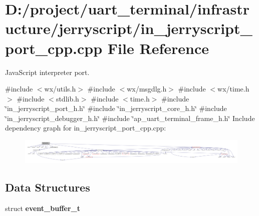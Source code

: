 \section{D\+:/project/uart\+\_\+terminal/infrastructure/jerryscript/in\+\_\+jerryscript\+\_\+port\+\_\+cpp.cpp File Reference}
\label{in__jerryscript__port__cpp_8cpp}


Java\+Script interpreter port.  


{\ttfamily \#include $<$wx/utils.\+h$>$}\newline
{\ttfamily \#include $<$wx/msgdlg.\+h$>$}\newline
{\ttfamily \#include $<$wx/time.\+h$>$}\newline
{\ttfamily \#include $<$stdlib.\+h$>$}\newline
{\ttfamily \#include $<$time.\+h$>$}\newline
{\ttfamily \#include \char`\"{}in\+\_\+jerryscript\+\_\+port\+\_\+h.\+h\char`\"{}}\newline
{\ttfamily \#include \char`\"{}in\+\_\+jerryscript\+\_\+core\+\_\+h.\+h\char`\"{}}\newline
{\ttfamily \#include \char`\"{}in\+\_\+jerryscript\+\_\+debugger\+\_\+h.\+h\char`\"{}}\newline
{\ttfamily \#include \char`\"{}ap\+\_\+uart\+\_\+terminal\+\_\+frame\+\_\+h.\+h\char`\"{}}\newline
Include dependency graph for in\+\_\+jerryscript\+\_\+port\+\_\+cpp.\+cpp\+:
\nopagebreak
\begin{figure}[H]
\begin{center}
\leavevmode
\includegraphics[width=350pt]{in__jerryscript__port__cpp_8cpp__incl}
\end{center}
\end{figure}
\subsection*{Data Structures}
\begin{DoxyCompactItemize}
\item 
struct \textbf{ event\+\_\+buffer\+\_\+t}
\end{DoxyCompactItemize}
